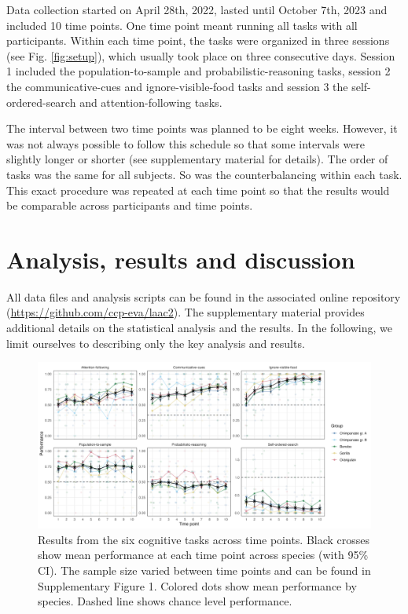 \documentclass[
  man,floatsintext]{apa6}
\begin{document}
Data collection started on April 28th, 2022, lasted until October 7th, 2023 and included 10 time points. One time point meant running all tasks with all participants. Within each time point, the tasks were organized in three sessions (see Fig. \ref{fig:setup}), which usually took place on three consecutive days. Session 1 included the population-to-sample and probabilistic-reasoning tasks, session 2 the communicative-cues and ignore-visible-food tasks and session 3 the self-ordered-search and attention-following tasks.

The interval between two time points was planned to be eight weeks. However, it was not always possible to follow this schedule so that some intervals were slightly longer or shorter (see supplementary material for details). The order of tasks was the same for all subjects. So was the counterbalancing within each task. This exact procedure was repeated at each time point so that the results would be comparable across participants and time points.

\section{Analysis, results and discussion}\label{analysis-results-and-discussion}

All data files and analysis scripts can be found in the associated online repository (\url{https://github.com/ccp-eva/laac2}). The supplementary material provides additional details on the statistical analysis and the results. In the following, we limit ourselves to describing only the key analysis and results.

\begin{figure}
\includegraphics[width=1\linewidth]{../visuals/perf} \caption{Results from the six cognitive tasks across time points. Black crosses show mean performance at each time point across species (with 95\% CI). The sample size varied between time points and can be found in Supplementary Figure 1. Colored dots show mean performance by species. Dashed line shows chance level performance.}\label{fig:perfplot}
\end{figure}
\end{document}
